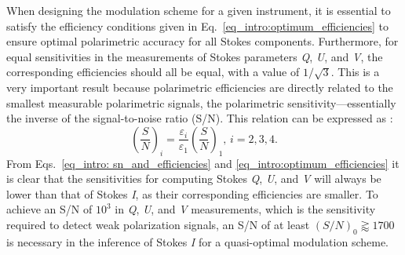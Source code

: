 When designing the modulation scheme for a given instrument, it is essential to satisfy the efficiency conditions given in Eq.~\eqref{eq_intro:optimum_efficiencies} to ensure optimal polarimetric accuracy for all Stokes components. Furthermore, for equal sensitivities in the measurements of Stokes parameters \textit{Q}, \textit{U}, and \textit{V}, the corresponding efficiencies should all be equal, with a value of $1/\sqrt{3}$. This is a very important result because polarimetric efficiencies are directly related to the smallest measurable polarimetric signals, the polarimetric sensitivity—essentially the inverse of the signal-to-noise ratio (S/N). This relation can be expressed as \citep{optimum_modulation}:
\begin{equation}
  \left( \frac{S}{N}\right)_i = \frac{\varepsilon _ i}{\varepsilon _ 1} \left(\frac{S}{N}\right)_1 \text{,    } i = 2, 3, 4 .
  \label{eq_intro: sn_and_efficiencies}
\end{equation}
From Eqs.~\eqref{eq_intro: sn_and_efficiencies} and \eqref{eq_intro:optimum_efficiencies} it is clear that the sensitivities for computing Stokes \textit{Q}, \textit{U}, and \textit{V} will always be lower than that of Stokes \textit{I}, as their corresponding efficiencies are smaller. To achieve an S/N of $10^3$ in \textit{Q}, \textit{U}, and \textit{V} measurements, which is the sensitivity required to detect weak polarization signals, an S/N of at least $ \left(S/N \right)_0 \gtrapprox 1700$ is necessary in the inference of Stokes \textit{I} for a quasi-optimal modulation scheme.

